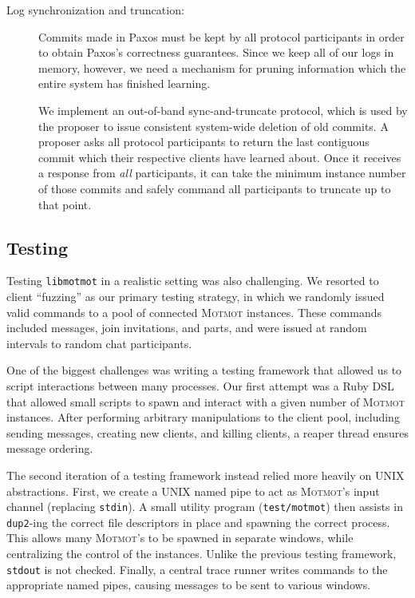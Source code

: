 \documentclass{sig-alternate}
\newcommand\Motmot{\textsc{Motmot}\xspace}
\newcommand\libmotmot{\texttt{libmotmot}\xspace}
\begin{document}
\begin{description}
  \item[Log synchronization and truncation:]
    Commits made in Paxos must be kept by all protocol participants in order
    to obtain Paxos's correctness guarantees.  Since we keep all of our logs
    in memory, however, we need a mechanism for pruning information which
    the entire system has finished learning.

    We implement an out-of-band sync-and-truncate protocol, which is used by
    the proposer to issue consistent system-wide deletion of old commits.  A
    proposer asks all protocol participants to return the last contiguous
    commit which their respective clients have learned about.  Once it receives
    a response from \emph{all} participants, it can take the minimum instance
    number of those commits and safely command all participants to truncate
    up to that point.
\end{description}

\subsection{Testing}

Testing \libmotmot in a realistic setting was also challenging. We resorted to
client ``fuzzing'' as our primary testing strategy, in which we randomly issued
valid commands to a pool of connected \Motmot instances. These commands included
messages, join invitations, and parts, and were issued at random intervals to
random chat participants.

One of the biggest challenges was writing a testing framework that allowed us to
script interactions between many processes. Our first attempt was a Ruby DSL
that allowed small scripts to spawn and interact with a given number of \Motmot
instances. After performing arbitrary manipulations to the client pool,
including sending messages, creating new clients, and killing clients, a reaper
thread ensures message ordering.

The second iteration of a testing framework instead relied more heavily on UNIX
abstractions. First, we create a UNIX named pipe to act as \Motmot's input
channel (replacing \texttt{stdin}). A small utility program
(\texttt{test/motmot}) then assists in \texttt{dup2}-ing the correct file
descriptors in place and spawning the correct process. This allows many
\Motmot's to be spawned in separate windows, while centralizing the control of
the instances. Unlike the previous testing framework, \texttt{stdout} is not
checked. Finally, a central trace runner writes commands to the appropriate
named pipes, causing messages to be sent to various windows.
\end{document}
